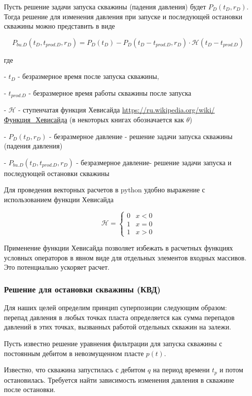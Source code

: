 Пусть решение задачи запуска скважины (падения давления) будет $P_D(t_D, r_D)$. Тогда решение для изменения давления при запуске и последующей остановки скважины можно представить в виде 

\begin{equation}
	P_{bu.D}(t_D, t_{prod.D}, r_D) = P_D(t_D) - P_D(t_D-t_{prod.D}, r_D) \cdot \mathcal{H}(t_D-t_{prod.D}) 
\end{equation}

где

- $t_D$ - безразмерное время после запуска скважины,

- $t_{prod.D}$ - безразмерное время работы скважины после запуска

- $\mathcal{H}$ - ступенчатая функция Хевисайда \url{https://ru.wikipedia.org/wiki/Функция_Хевисайда} (в некоторых книгах обозначается как $\theta$)

- $P_D(t_D, r_D)$ - безразмерное давление - решение задачи запуска скважины (падения давления)

- $P_{bu.D}(t_D, t_{prod.D}, r_D)$ - безразмерное давление- решение задачи запуска  и последующей остановки скважины

Для проведения векторных расчетов в python удобно выражение с использованием функции Хевисайда

$$ \mathcal{H} = \begin{cases}0 & x < 0\\1 & x = 0\\1 & x > 0\end{cases}$$

Применение функции Хевисайда позволяет избежать в расчетных функциях условных операторов в явном виде для отдельных элементов входных массивов. Это потенциально ускоряет расчет. 



\subsubsection{Решение для остановки скважины (КВД)}

Для наших целей определим принцип суперпозиции следующим образом: перепад давления в любых точках пласта определяется как сумма перепадов давлений в этих точках, вызванных работой отдельных скважин на залежи. 

Пусть известно решение уравнения фильтрации для запуска скважины с постоянным дебитом в невозмущенном пласте   $p(t)$. 

Известно, что скважина запустилась с дебитом $q$ на период времени $t_p$ и потом остановилась. Требуется найти зависимость изменения давления в скважине после остановки.

